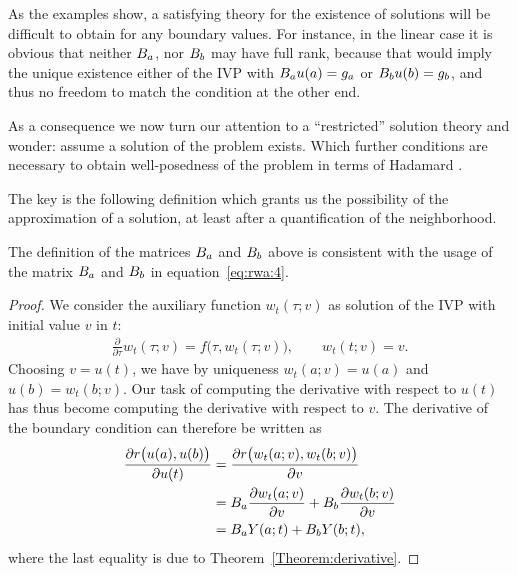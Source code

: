 \begin{remark}
  As the examples show, a satisfying theory for the existence of
  solutions will be difficult to obtain for any boundary values. For
  instance, in the linear case it is obvious that neither $B_a$, nor
  $B_b$ may have full rank, because that would imply the unique
  existence either of the IVP with $B_a u(a) = g_a$ or
  $B_b u(b) = g_b$, and thus no freedom to match the condition at
  the other end.

  As a consequence we now turn our attention to a ``restricted''
  solution theory and wonder: assume a solution of the problem
  exists. Which further conditions are necessary to obtain
  well-posedness of the problem in terms of Hadamard
  .

  The key is the following definition which grants us the possibility
  of the approximation of a solution, at least after a quantification
  of the neighborhood.
\end{remark}




\begin{remark}
  The definition of the matrices $B_a$ and $B_b$ above is
  consistent with the usage of the matrix $B_a$ and $B_b$ in
  equation~\eqref{eq:rwa:4}.
\end{remark}

\begin{proof}
  We consider the auxiliary function $w_t(\tau;v)$ as solution of the
  IVP with initial value $v$ in $t$:
  \begin{gather*}
    \frac{\partial}{\partial \tau} w_t(\tau;v)
    = f\bigl(\tau,w_t(\tau;v)\bigr), \qquad w_t(t;v) = v.
  \end{gather*}
  Choosing $v=u(t)$, we have by uniqueness $w_t(a;v) = u(a)$ and
  $u(b) = w_t(b;v)$. Our task of computing the derivative with respect
  to $u(t)$ has thus become computing the derivative with respect to
  $v$. The derivative of the boundary condition can therefore be
  written as
  \begin{align*}
    \frac{\partial r\bigl(u(a),u(b)\bigr)}{\partial u(t)}
    &=
    \frac{\partial r\bigl(w_t(a;v),w_t(b;v)\bigr)}{\partial v}
    \\
    &= \rwaa \frac{\partial w_t(a;v)}{\partial v}
    + \rwab \frac{\partial w_t(b;v)}{\partial v}
    \\
    &= \rwaa \fundamental(a;t) + \rwab \fundamental(b;t),
  \end{align*}
  where the last equality is due to Theorem~\ref{Theorem:derivative}.
\end{proof}


